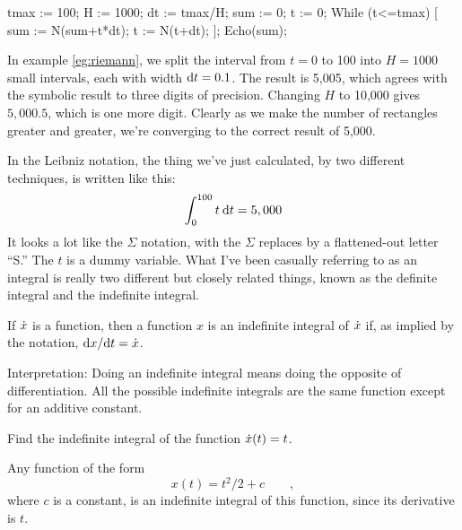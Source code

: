 
\restartLineNumbers
\begin{eg}\label{eg:riemann}
\startcodeeg
\begin{Code}
  \nn tmax := 100;
  \nn H := 1000;
  \nn dt := tmax/H;
  \nn sum := 0;
  \nn t := 0;
  \nn While (t<=tmax) [
  \nn   sum := N(sum+t*dt);
  \nn   t := N(t+dt);
  \nn ];
  \nn Echo(sum);
\end{Code}
\end{eg}

In example \ref{eg:riemann}, we split the interval from $t=0$ to 100 into $H=1000$ small
intervals, each with width $\textup{d} t=0.1$. The result is 5,005, which agrees with the symbolic
result to three digits of precision. Changing $H$ to 10,000 gives $5,000.5$, which is one
more digit. Clearly as we make the number of rectangles greater and greater, we're converging
to the correct result of 5,000.

In the Leibniz notation,
the thing we've just calculated, by two different techniques, is written like
this:
\begin{equation*}
  \int_{0}^{100} t \:\textup{d} t = 5,000
\end{equation*}
It looks a lot like the $\Sigma$ notation, with the $\Sigma$ replaces by a flattened-out letter ``S.''
The $t$ is a dummy variable. What I've been casually referring to as an integral is really two different
but closely related things, known as the definite integral and the indefinite integral.

\begin{important}
If $\dot{x}$ is a function, then a function $x$ is an indefinite integral of $\dot{x}$ if,
as implied by the notation, $\textup{d} x/\textup{d} t=\dot{x}$.

Interpretation: Doing an indefinite integral means doing the opposite of differentiation.
All the possible indefinite integrals are the same function except for an additive constant.
\end{important}

\begin{eg}
\egquestion Find the indefinite integral of the function $\dot{x}(t)=t$.

\eganswer Any function of the form
\begin{equation*}
  x(t)=t^2/2+c \qquad ,
\end{equation*}
where $c$ is a constant, is an
indefinite integral of this function, since its derivative is $t$.
\end{eg}

